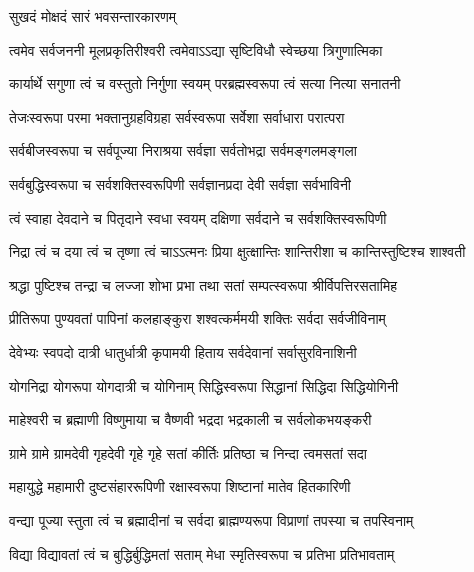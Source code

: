 

{सुखदं मोक्षदं सारं भवसन्तारकारणम्}

\twolineshloka
{त्वमेव सर्वजननी मूलप्रकृतिरीश्वरी}
{त्वमेवाऽऽद्या सृष्टिविधौ स्वेच्छया त्रिगुणात्मिका}

\twolineshloka
{कार्यार्थे सगुणा त्वं च वस्तुतो निर्गुणा स्वयम्}
{परब्रह्मस्वरूपा त्वं सत्या नित्या सनातनी}

\twolineshloka
{तेजःस्वरूपा परमा भक्तानुग्रहविग्रहा}
{सर्वस्वरूपा सर्वेशा सर्वाधारा परात्परा}

\twolineshloka
{सर्वबीजस्वरूपा च सर्वपूज्या निराश्रया}
{सर्वज्ञा सर्वतोभद्रा सर्वमङ्गलमङ्गला}

\twolineshloka
{सर्वबुद्धिस्वरूपा च सर्वशक्तिस्वरूपिणी}
{सर्वज्ञानप्रदा देवी सर्वज्ञा सर्वभाविनी}

\twolineshloka
{त्वं स्वाहा देवदाने च पितृदाने स्वधा स्वयम्}
{दक्षिणा सर्वदाने च सर्वशक्तिस्वरूपिणी}

\twolineshloka
{निद्रा त्वं च दया त्वं च तृष्णा त्वं चाऽऽत्मनः प्रिया}
{क्षुत्क्षान्तिः शान्तिरीशा च कान्तिस्तुष्टिश्च शाश्वती}

\twolineshloka
{श्रद्धा पुष्टिश्च तन्द्रा च लज्जा शोभा प्रभा तथा}
{सतां सम्पत्स्वरूपा श्रीर्विपत्तिरसतामिह}

\twolineshloka
{प्रीतिरूपा पुण्यवतां पापिनां कलहाङ्कुरा}
{शश्वत्कर्ममयी शक्तिः सर्वदा सर्वजीविनाम्}

\twolineshloka
{देवेभ्यः स्वपदो दात्री धातुर्धात्री कृपामयी}
{हिताय सर्वदेवानां सर्वासुरविनाशिनी}

\twolineshloka
{योगनिद्रा योगरूपा योगदात्री च योगिनाम्}
{सिद्धिस्वरूपा सिद्धानां सिद्धिदा सिद्धियोगिनी}

\twolineshloka
{माहेश्वरी च ब्रह्माणी विष्णुमाया च वैष्णवी}
{भद्रदा भद्रकाली च सर्वलोकभयङ्करी}

\twolineshloka
{ग्रामे ग्रामे ग्रामदेवी गृहदेवी गृहे गृहे}
{सतां कीर्तिः प्रतिष्ठा च निन्दा त्वमसतां सदा}

\twolineshloka
{महायुद्धे महामारी दुष्टसंहाररूपिणी}
{रक्षास्वरूपा शिष्टानां मातेव हितकारिणी}

\twolineshloka
{वन्द्या पूज्या स्तुता त्वं च ब्रह्मादीनां च सर्वदा}
{ब्राह्मण्यरूपा विप्राणां तपस्या च तपस्विनाम्}

\twolineshloka
{विद्या विद्यावतां त्वं च बुद्धिर्बुद्धिमतां सताम्}
{मेधा स्मृतिस्वरूपा च प्रतिभा प्रतिभावताम्}

